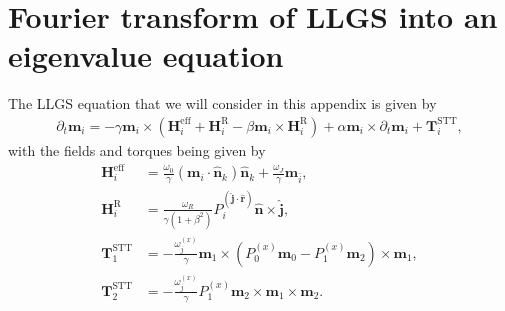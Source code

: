 \chapter{Fourier transform of LLGS into an eigenvalue equation}\label{app:FourierLLGS}
The LLGS equation that we will consider in this appendix is given by
\begin{align}
    \label{eq:LLGS_app}
    \partial_t \mathbold{m}_i = -\gamma \mathbold{m}_i\times\left(\mathbold{H}^{\text{eff}}_i+\mathbold{H}^{\text{R}}_i - \beta\mathbold{m}_i\times\mathbold{H}^{\text{R}}_i\right) + \alpha\mathbold{m}_i \times\partial_t\mathbold{m}_i + \mathbold{T}^{\text{STT}}_i,
\end{align}
with the fields and torques being given by
\begin{subequations}
\begin{align}
    \mathbold{H}^{\text{eff}}_i &= \frac{\omega_0}{\gamma}\left( \mathbold{m}_i \cdot \mathbold{\hat{n}}_k\right)\mathbold{\hat{n}}_k + \frac{\omega_J}{\gamma} \mathbold{m}_{\bar{i}}, \\
    \mathbold{H}^{\text{R}}_i &= \frac{\omega_R}{\gamma(1+\beta^2)} P^{(\mathbold{\hat{j}}\cdot\mathbold{\hat{r}})}_i \mathbold{\hat{n}}\times\mathbold{\hat{j}}, \\
    \mathbold{T}^{\text{STT}}_1 &= -\frac{\omega^{(x)}_j}{\gamma} \mathbold{m}_1\times\left( P_0^{(x)}\mathbold{m}_0 - P_1^{(x)} \mathbold{m}_2\right) \times \mathbold{m}_1, \\
    \mathbold{T}^{\text{STT}}_2 &= -\frac{\omega^{(x)}_j}{\gamma} P_1^{(x)} \mathbold{m}_2\times \mathbold{m}_1 \times \mathbold{m}_2.
\end{align}
\end{subequations}
